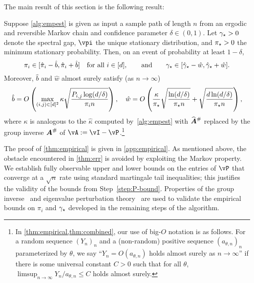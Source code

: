 The main result of this section is the following result:
\begin{theorem}
  \label{thm:empirical}
  Suppose \cref{alg:empest} is given as input a sample path of length
  $n$ from an ergodic and reversible Markov chain and confidence
  parameter $\delta \in (0,1)$.
  Let $\gamma_{\star}>0$ denote the spectral gap, $\vpi$ the unique stationary
  distribution, and $\pi_{\star}>0$ the minimum stationary probability.
  Then, on an event of probability at least $1-\delta$,
  \[
    \pi_i \in [\hat\pi_i-\hat{b},\hat\pi_i+\hat{b}]
    \quad \text{for all $i \in [d]$} ,
    \qquad\text{and}\qquad
    \gamma_{\star} \in [\hat\gamma_{\star}-\hat{w},\hat\gamma_{\star}+\hat{w}]
    .
  \]
  Moreover, $\hat{b}$ and $\hat{w}$ almost surely satisfy (as $n \to
  \infty$)
  \[
    \hat{b}
    =
    O\left(
      \max_{(i,j) \in [d]^2}
      \kappa
      \sqrt{\frac{P_{i,j}\log(d/\delta)}{\pi_i n}}
    \right)
    ,
    \quad
    \hat{w}
    =
     O\left( 
     \frac{\kappa}{\pi_{\star}} \sqrt{\frac{\ln(d/\delta)}{\pi_{\star} n}} + 
      \sqrt{ \frac{d\ln(d/\delta)}{ \pi_{\star} n}}
    \right)
    ,
  \]
  where $\kappa$ is analogous to the $\hat{\kappa}$ computed
  by~\cref{alg:empest} with $\giAh$ replaced by the group inverse
  $\giA$ of $\vA := \vI - \vP$.\footnote{%
    In \cref{thm:empirical,thm:combined}, our use of big-$O$ notation
    is as follows.
    For a random sequence $(Y_n)_n$ and a (non-random) positive
    sequence $(a_{\theta,n})_n$ parameterized by $\theta$, we say
    ``$Y_n = O(a_{\theta,n})$ holds almost surely as $n\to\infty$'' if
    there is some universal constant $C>0$ such that for all $\theta$,
    $\limsup_{n\to\infty} Y_n/a_{\theta,n} \leq C$ holds almost
    surely.%
  }%
\end{theorem}
The proof of \cref{thm:empirical} is given in \cref{app:empirical}.
As mentioned above, the obstacle encountered in \cref{thm:err} is
avoided by exploiting the Markov property.
We establish fully observable upper and lower bounds on the entries of
$\vP$ that converge at a $\sqrt{n}$ rate using standard martingale
tail inequalities; this justifies the validity of the bounds from
Step~\ref{step:P-bound}.
Properties of the group inverse~\citep{meyer1975role,cho2001comparison} and eigenvalue
perturbation theory~\citep{stewart1990matrix} are used to validate the
empirical bounds on $\pi_i$ and $\gamma_{\star}$ developed in the remaining
steps of the algorithm.

